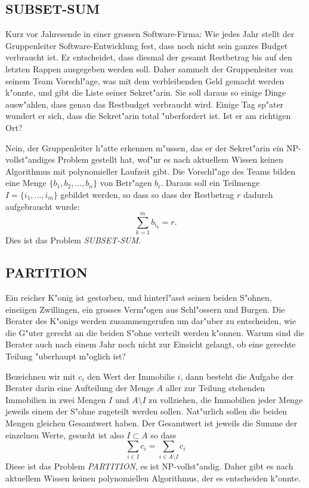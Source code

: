 \subsection{SUBSET-SUM}
Kurz vor Jahresende in einer grossen Software-Firma: Wie jedes Jahr stellt
der Gruppenleiter Software-Entwicklung fest, dass noch nicht sein ganzes
Budget verbraucht ist.  Er entscheidet, dass diesmal der gesamt Restbetrag
bis auf den letzten Rappen
ausgegeben werden soll.  Daher sammelt der Gruppenleiter von seinem
Team Vorschl"age, was mit dem verbleibenden Geld gemacht werden k"onnte,
und gibt die Liste seiner Sekret"arin.  Sie soll daraus so einige Dinge
ausw"ahlen, dass genau das Restbudget verbraucht wird. Einige Tag sp"ater
wundert er sich, dass die Sekret"arin total "uberfordert ist. Ist er
am richtigen Ort?

\medskip

Nein, der Gruppenleiter h"atte erkennen m"ussen, das er der Sekret"arin
ein NP-vollst"andiges Problem gestellt hat, wof"ur es nach aktuellem
Wissen keinen Algorithmus mit polynomieller Laufzeit gibt. Die Vorschl"age
des Teams bilden eine Menge $\{b_1,b_2,\dots,b_n\}$ von Betr"agen $b_i$.
Daraus soll ein Teilmenge $I=\{i_1,\dots,i_m\}$ gebildet werden, so dass
so dass der Restbetrag $r$ dadurch aufgebraucht wurde:
\[
\sum_{k=1}^m b_{i_k} = r.
\]
Dies ist das Problem {\it SUBSET-SUM}.

\subsection{PARTITION}
Ein reicher K"onig ist gestorben, und hinterl"asst seinen beiden
S"ohnen, eineiigen Zwillingen, ein grosses Verm"ogen aus Schl"ossern
und Burgen. Die Berater des K"onigs werden zusammengerufen um
dar"uber zu entscheiden, wie die G"uter gerecht an die beiden S"ohne
verteilt werden k"onnen. Warum sind die Berater auch nach einem Jahr
noch nicht zur Einsicht gelangt, ob eine gerechte Teilung "uberhaupt
m"oglich ist?

Bezeichnen wir mit $c_i$ den Wert der Immobilie $i$, dann besteht
die Aufgabe der Berater darin eine Aufteilung der Menge $A$ aller 
zur Teilung stehenden Immobilien in zwei Mengen $I$ und $A\setminus I$
zu vollziehen, die Immobilien jeder Menge jeweils einem der S"ohne zugeteilt
werden sollen.
Nat"urlich sollen die beiden Mengen gleichen Gesamtwert haben.
Der Gesamtwert ist jeweils die Summe der einzelnen Werte, gesucht ist also
$I\subset A$ so dass
\[
\sum_{i\in I}c_i =\sum_{i\in A\setminus I}c_i
\]
Diese ist das Problem {\it PARTITION}, es ist NP-vollst"andig.
Daher gibt es nach aktuellem Wissen keinen polynomiellen Algorithmus,
der es entscheiden k"onnte.


